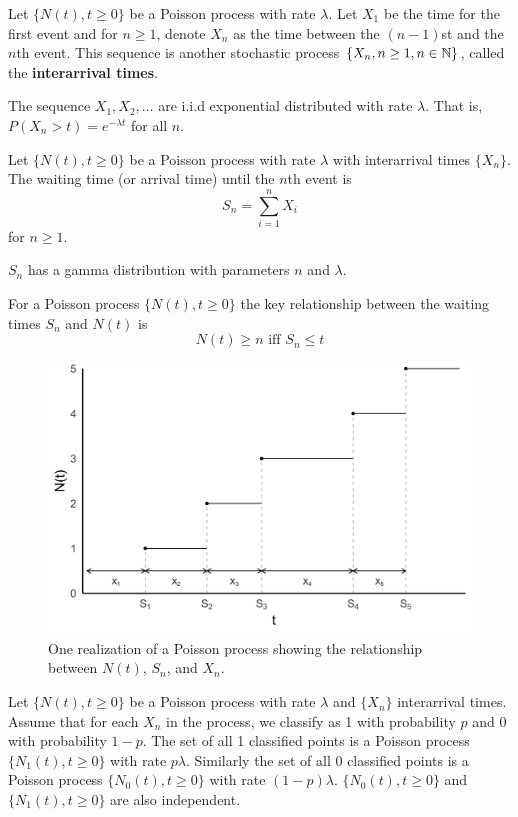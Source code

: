 \begin{defn} \cite{Ross_SP_95}
Let $\{N(t), t \geq 0\}$ be a Poisson process with rate $\lambda$.
Let $X_1$ be the time for the first event and for $n \geq 1$,
denote $X_n$ as the time between the $(n - 1)$st and the $n$th event.
This sequence is another stochastic process $\{X_n, n \geq 1, n \in \mathbb{N}\}$, called the \textbf{interarrival times}.

The sequence $X_1,X_2, \ldots$ are i.i.d exponential distributed with rate $\lambda$. That is, $P(X_n > t) = e^{-\lambda t}$ for all $n$.
\end{defn}

\begin{defn} \cite{Ross_SP_95}
Let $\{N(t), t \geq 0\}$ be a Poisson process with rate $\lambda$ with interarrival times $\{X_n\}$.
The waiting time (or arrival time) until the $n$th event is 
$$
S_n  = \sum_{i = 1}^n X_i
$$
for $n \geq 1$.

$S_n$ has a gamma distribution with parameters $n$ and $\lambda$.
\end{defn}

\begin{remark}
For a Poisson process $\{N(t), t \geq 0\}$ the key relationship between the waiting times $S_n$ and $N(t)$ is
$$
N(t) \geq n \text{ iff } S_n \leq t
$$
\end{remark}

\begin{figure}[H]
  \centering
    \includegraphics[width=.9\textwidth]{figures/poisson_realization.png}
   \caption{One realization of a Poisson process showing the relationship between $N(t)$, $S_n$, and $X_n$.}
  \label{fig:poisson_realization}
\end{figure}

\begin{theorem} \label{thm:poisson_thinning}
Let $\{N(t), t \geq 0\}$ be a Poisson process with rate $\lambda$ and $\{X_n\}$ interarrival times.
Assume that for each $X_n$ in the process, we classify as 1 with probability $p$ and 0 with probability $1 - p$.
The set of all 1 classified points is a Poisson process $\{N_1(t), t \geq 0\}$ with rate $p \lambda$.
Similarly the set of all 0 classified points is a Poisson process $\{N_0(t), t \geq 0\}$ with rate $(1 - p) \lambda$.
$\{N_0(t), t \geq 0\}$ and $\{N_1(t), t \geq 0\}$ are also independent.
\end{theorem}

